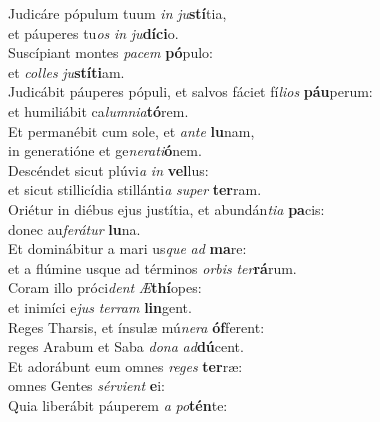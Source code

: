 \evenverse Judicáre pópulum tuum \textit{in} \textit{ju}\textbf{stí}tia,~\*\\
\evenverse et páuperes tu\textit{os} \textit{in} \textit{ju}\textbf{dí}\textbf{ci}o.\\
\oddverse Suscípiant montes \textit{pa}\textit{cem} \textbf{pó}pulo:~\*\\
\oddverse et \textit{col}\textit{les} \textit{ju}\textbf{stí}\textbf{ti}am.\\
\evenverse Judicábit páuperes pópuli, et salvos fáciet fí\textit{li}\textit{os} \textbf{páu}perum:~\*\\
\evenverse et humiliábit ca\textit{lum}\textit{ni}\textit{a}\textbf{tó}rem.\\
\oddverse Et permanébit cum sole, et \textit{an}\textit{te} \textbf{lu}nam,~\*\\
\oddverse in generatióne et ge\textit{ne}\textit{ra}\textit{ti}\textbf{ó}nem.\\
\evenverse Descéndet sicut plúvi\textit{a} \textit{in} \textbf{vel}lus:~\*\\
\evenverse et sicut stillicídia stillánti\textit{a} \textit{su}\textit{per} \textbf{ter}ram.\\
\oddverse Oriétur in diébus ejus justítia, et abundán\textit{ti}\textit{a} \textbf{pa}cis:~\*\\
\oddverse donec au\textit{fe}\textit{rá}\textit{tur} \textbf{lu}na.\\
\evenverse Et dominábitur a mari us\textit{que} \textit{ad} \textbf{ma}re:~\*\\
\evenverse et a flúmine usque ad términos \textit{or}\textit{bis} \textit{ter}\textbf{rá}rum.\\
\oddverse Coram illo próci\textit{dent} \textit{Æ}\textbf{thí}opes:~\*\\
\oddverse et inimíci e\textit{jus} \textit{ter}\textit{ram} \textbf{lin}gent.\\
\evenverse Reges Tharsis, et ínsulæ mú\textit{ne}\textit{ra} \textbf{óf}ferent:~\*\\
\evenverse reges Arabum et Saba \textit{do}\textit{na} \textit{ad}\textbf{dú}cent.\\
\oddverse Et adorábunt eum omnes \textit{re}\textit{ges} \textbf{ter}ræ:~\*\\
\oddverse omnes Gentes \textit{sér}\textit{vi}\textit{ent} \textbf{e}i:\\
\evenverse Quia liberábit páuperem \textit{a} \textit{po}\textbf{tén}te:~\*\\

